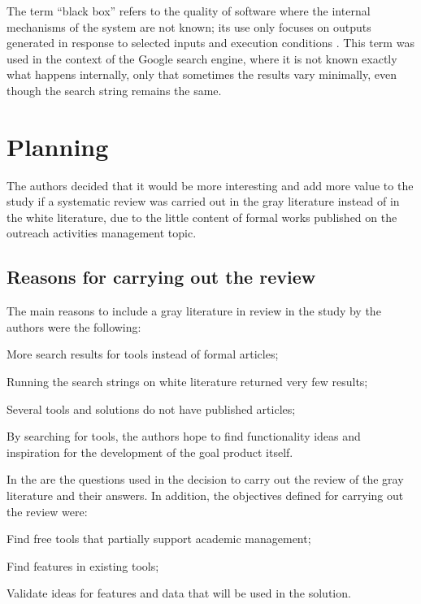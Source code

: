 The term ``black box'' refers to the quality of software where the internal mechanisms of the system are not known; its use only focuses on outputs generated in response to selected inputs and execution conditions \cite{nidhra2012black}. This term was used in the context of the Google search engine, where it is not known exactly what happens internally, only that sometimes the results vary minimally, even though the search string remains the same.

\section{Planning}\label{sec:gl-planning}

The authors decided that it would be more interesting and add more value to the study if a systematic review was carried out in the gray literature instead of in the white literature, due to the little content of formal works published on the outreach activities management topic.

\subsection{Reasons for carrying out the review}\label{sec:gl-planning-motives}

The main reasons to include a gray literature in review in the study by the authors were the following:
\begin{inparaenum}[(i)]
  \item More search results for tools instead of formal articles;
  \item Running the search strings on white literature returned very few results;
  \item Several tools and solutions do not have published articles;
  \item By searching for tools, the authors hope to find functionality ideas and inspiration for the development of the goal product itself.
\end{inparaenum}

In the  are the questions used in the decision to carry out the review of the gray literature and their answers. In addition, the objectives defined for carrying out the review were:

\begin{inparaenum}[(i)]
  \item Find free tools that partially support academic management;
  \item Find features in existing tools;
  \item Validate ideas for features and data that will be used in the solution.
\end{inparaenum}


